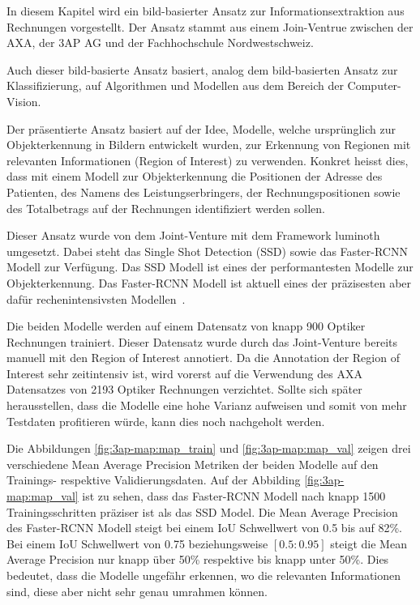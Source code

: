 In diesem Kapitel wird ein bild-basierter Ansatz zur Informationsextraktion aus Rechnungen vorgestellt. Der Ansatz stammt aus einem Join-Ventrue zwischen der AXA, der 3AP AG und der Fachhochschule Nordwestschweiz. 

Auch dieser bild-basierte Ansatz basiert, analog dem bild-basierten Ansatz zur Klassifizierung, auf Algorithmen und Modellen aus dem Bereich der Computer-Vision.

Der präsentierte Ansatz basiert auf der Idee, Modelle, welche ursprünglich zur Objekterkennung in Bildern entwickelt wurden, zur Erkennung von Regionen mit relevanten Informationen (Region of Interest) zu verwenden. Konkret heisst dies, dass mit einem Modell zur Objekterkennung die Positionen der Adresse des Patienten, des Namens des Leistungserbringers, der Rechnungspositionen sowie des Totalbetrags auf der Rechnungen identifiziert werden sollen. 

Dieser Ansatz wurde von dem Joint-Venture mit dem Framework luminoth umgesetzt. Dabei steht das Single Shot Detection (SSD) sowie das Faster-RCNN Modell zur Verfügung. Das SSD Modell ist eines der performantesten Modelle zur Objekterkennung. Das Faster-RCNN Modell ist aktuell eines der präzisesten aber dafür rechenintensivsten Modellen~\autocite{SSDFRCNN}.

Die beiden Modelle werden auf einem Datensatz von knapp 900 Optiker Rechnungen trainiert. Dieser Datensatz wurde durch das Joint-Venture bereits manuell mit den Region of Interest annotiert. Da die Annotation der Region of Interest sehr zeitintensiv ist, wird vorerst auf die Verwendung des AXA Datensatzes von 2193 Optiker Rechnungen verzichtet. Sollte sich später herausstellen, dass die Modelle eine hohe Varianz aufweisen und somit von mehr Testdaten profitieren würde, kann dies noch nachgeholt werden.

Die Abbildungen \ref{fig:3ap-map:map_train} und \ref{fig:3ap-map:map_val} zeigen drei verschiedene Mean Average Precision Metriken der beiden Modelle auf den Trainings- respektive Validierungsdaten. Auf der Abbilding \ref{fig:3ap-map:map_val} ist zu sehen, dass das Faster-RCNN Modell nach knapp 1500 Trainingsschritten präziser ist als das SSD Model. Die Mean Average Precision des Faster-RCNN Modell steigt bei einem IoU Schwellwert von 0.5 bis auf 82\%. Bei einem IoU Schwellwert von 0.75 beziehungsweise $[0.5:0.95]$ steigt die Mean Average Precision nur knapp über 50\% respektive bis knapp unter 50\%. Dies bedeutet, dass die Modelle ungefähr erkennen, wo die relevanten Informationen sind, diese aber nicht sehr genau umrahmen können.

